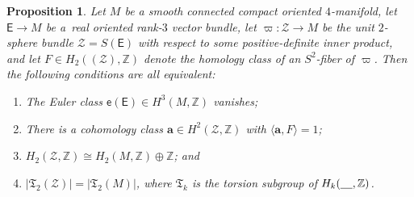 \documentclass[pdftex]{sigma}
\numberwithin{equation}{section}
\newtheorem{Proposition}[Theorem]{Proposition}
 { \theoremstyle{definition}
\newtheorem{Definition}[Theorem]{Definition}
\newtheorem*{geomdef}{Geometric Definition}
\newtheorem*{standef}{Standard Definition}
\newtheorem{Example}[Theorem]{Example}
\newtheorem*{xpl}{Example}
\newtheorem{Remark}[Theorem]{Remark} }
\def\ZZ{\mathbb{Z}}
\begin{document}
\begin{Proposition} \label{packet}
Let $M$ be a smooth connected compact oriented $4$-manifold, let $\mathsf{E}\to M$ be a~real oriented rank-$3$ vector bundle,
 let $\varpi\colon \mathcal{Z}\to M$ be the
unit $2$-sphere bundle $\mathcal{Z}= S(\mathsf{E})$ with respect to some positive-definite inner product, and let $F\in H_2((\mathcal{Z}), \ZZ)$ denote the homology class of an $S^2$-fiber of $\varpi$.
Then the following conditions are all equivalent:
\begin{enumerate}\itemsep=0pt
\item[$(i)$] The Euler class $\mathsf{e}(\mathsf{E}) \in H^3(M, \ZZ)$ vanishes; %
\item[$(ii)$] There is a cohomology class $\mathbf{a}\in H^2 (\mathcal{Z}, \ZZ)$ with $\langle \mathbf{a}, F\rangle =1$; %
\item[$(iii)$] $H_2(\mathcal{Z}, \ZZ) \cong H_2 (M, \ZZ ) \oplus \ZZ$; and %
\item[$(iv)$] $|\mathfrak{T}_2 (\mathcal{Z})| = |\mathfrak{T}_2 (M)|$, where $\mathfrak{T}_k$ is the torsion subgroup of
 $H_k(\underline{\hphantom{M}}, \ZZ)$. %
\end{enumerate}
\end{Proposition}
\end{document}
